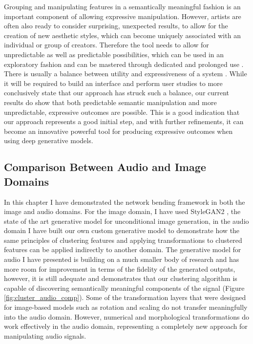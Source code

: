 Grouping and manipulating features in a semantically meaningful fashion is an important component of allowing expressive manipulation. 
However, artists are often also ready to consider surprising, unexpected results, to allow for the creation of new aesthetic styles, which can become uniquely associated with an individual or group of creators. 
Therefore the tool needs to allow for unpredictable as well as predictable possibilities, which can be used in an exploratory fashion and can be mastered through dedicated and prolonged use \citep{dobrian2006nime}. 
There is usually a balance between utility and expressiveness of a system \citep{jacobs2017supporting}. 
While it will be required to build an interface and perform user studies to more conclusively state that our approach has struck such a balance, our current results do show that both predictable semantic manipulation and more unpredictable, expressive outcomes are possible. 
This is a good indication that our approach represents a good initial step, and with further refinements, it can become an innovative powerful tool for producing expressive outcomes when using deep generative models. 

\subsection{Comparison Between Audio and Image Domains}

In this chapter I have demonstrated the network bending framework in both the image and audio domains. 
For the image domain, I have used StyleGAN2 \citep{karras2019analyzing}, the state of the art generative model for unconditional image generation, in the audio domain I have built our own custom generative model to demonstrate how the same principles of clustering features and applying transformations to clustered features can be applied indirectly to another domain. 
The generative model for audio I have presented is building on a much smaller body of research and has more room for improvement in terms of the fidelity of the generated outputs, however, it is still adequate and demonstrates that our clustering algorithm is capable of discovering semantically meaningful components of the signal (Figure \ref{fig:cluster_audio_comp}). 
Some of the transformation layers that were designed for image-based models such as rotation and scaling do not transfer meaningfully into the audio domain. 
However, numerical and morphological transformations do work effectively in the audio domain, representing a completely new approach for manipulating audio signals. 


